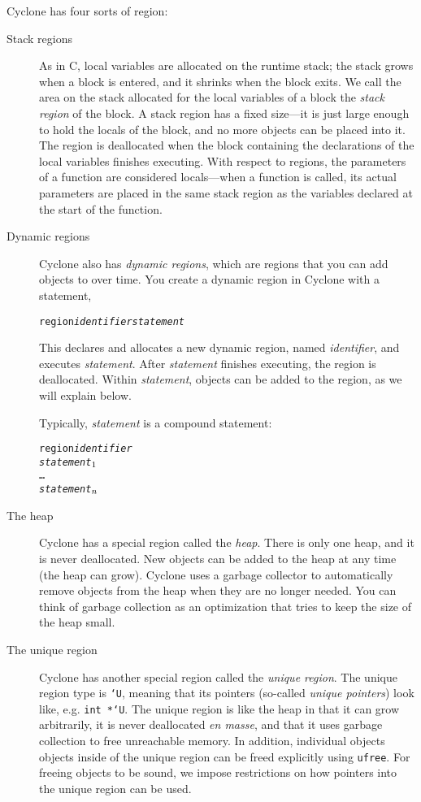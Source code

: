 Cyclone has four sorts of region:
\begin{description}
\item[Stack regions] As in C, local variables are allocated on the
  runtime stack; the stack grows when a block is entered, and it
  shrinks when the block exits.  We call the area on the stack
  allocated for the local variables of a block the \emph{stack region}
  of the block.  A stack region has a fixed size---it is just large
  enough to hold the locals of the block, and no more objects can be
  placed into it.  The region is deallocated when the block containing
  the declarations of the local variables finishes executing.  With
  respect to regions, the parameters of a function are considered
  locals---when a function is called, its actual parameters are placed
  in the same stack region as the variables declared at the start of
  the function.
  
\item[Dynamic regions] Cyclone also has \emph{dynamic regions},
  which are regions that you can add objects to over time.  You create
  a dynamic region in Cyclone with a statement,
\begin{alltt}
  region {\it identifier} {\it statement}
\end{alltt}
  This declares and allocates a new dynamic region, named
  \textit{identifier}, and executes \textit{statement}.  After
  \textit{statement} finishes executing, the region is deallocated.
  Within \textit{statement}, objects can be added to the region, as we
  will explain below.

  Typically, \textit{statement} is a compound statement:
\begin{alltt}
  region \textit{identifier} \lb
    {\it statement}\(\sb{1}\)
    \ldots
    {\it statement}\(\sb{n}\)
  \rb
\end{alltt}

\item[The heap] Cyclone has a special region called the \emph{heap}.
  There is only one heap, and it is never deallocated.  New objects
  can be added to the heap at any time (the heap can grow).  Cyclone
  uses a garbage collector to automatically remove objects from the
  heap when they are no longer needed.  You can think of garbage
  collection as an optimization that tries to keep the size of the
  heap small.

\item[The unique region] Cyclone has another special region called the
  \emph{unique region}.  The unique region type is \texttt{`U}, meaning that
  its pointers (so-called \emph{unique pointers}) look like,
  e.g. \texttt{int *`U}.  The unique region is like the heap in that it can
  grow arbitrarily, it is never deallocated \emph{en masse}, and that it
  uses garbage collection to free unreachable memory.  In addition,
  individual objects objects inside of the unique region can be freed
  explicitly using \texttt{ufree}.  For freeing objects to be sound, we
  impose restrictions on how pointers into the unique region can be used.
\end{description}

